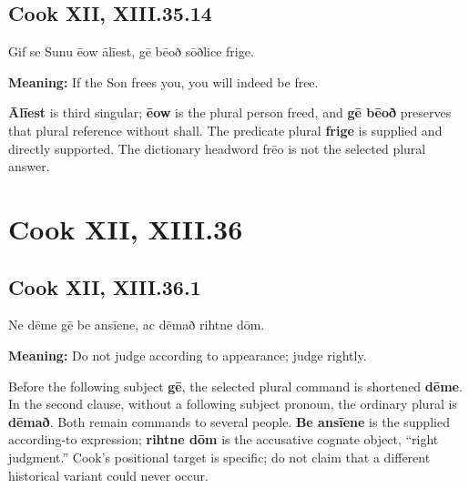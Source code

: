 \par\begin{minipage}{\linewidth}\raggedright
\subsection*{Cook XII, XIII.35.14}

Gif se Sunu ēow ālīest, gē bēoð sōðlice frige.

\textbf{Meaning:} If the Son frees you, you will indeed be free.

\textbf{Ālīest} is third singular; \textbf{ēow} is the plural person freed, and \textbf{gē bēoð} preserves that plural reference without shall. The predicate plural \textbf{frige} is supplied and directly supported. The dictionary headword frēo is not the selected plural answer.

\end{minipage}\par\addvspace{4pt}

\clearpage
\section*{Cook XII, XIII.36}

\par\begin{minipage}{\linewidth}\raggedright
\subsection*{Cook XII, XIII.36.1}

Ne dēme gē be ansīene, ac dēmað rihtne dōm.

\textbf{Meaning:} Do not judge according to appearance; judge rightly.

Before the following subject \textbf{gē}, the selected plural command is shortened \textbf{dēme}. In the second clause, without a following subject pronoun, the ordinary plural is \textbf{dēmað}. Both remain commands to several people. \textbf{Be ansīene} is the supplied according-to expression; \textbf{rihtne dōm} is the accusative cognate object, “right judgment.” Cook’s positional target is specific; do not claim that a different historical variant could never occur.

\end{minipage}\par\addvspace{4pt}

